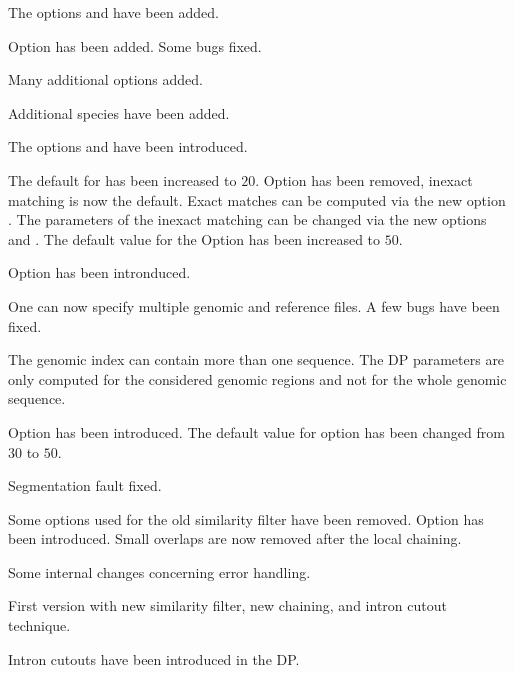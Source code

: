 \documentclass[11pt,a4paper,titlepage]{article}
\begin{document}
 The options  and  have been added.

 Option  has been added. Some bugs fixed.

 Many additional options added.

 Additional species have been added.

 The options  and  have been introduced.

 The default for  has been increased to $20$. Option  has been removed, inexact matching is now the default. Exact matches can be computed via the new option . The parameters of the inexact matching can be changed via the new options  and .
The default value for the Option  has been increased to $50$.

 Option  has been intronduced.

 One can now specify multiple genomic and reference files. A few bugs have been fixed.

 The genomic index can contain more than one sequence. The DP parameters are only computed for the considered genomic regions and not
for the whole genomic sequence.

 Option  has been introduced. The default value for option  has been changed from $30$ to $50$.

 Segmentation fault fixed. 

 Some options used for the old similarity filter have been removed. Option  has been introduced. Small overlaps are now removed after the local chaining.

 Some internal changes concerning error handling. 

 First version with new similarity filter, new chaining, and intron cutout technique.

 Intron cutouts have been introduced in the DP.
\end{document}
